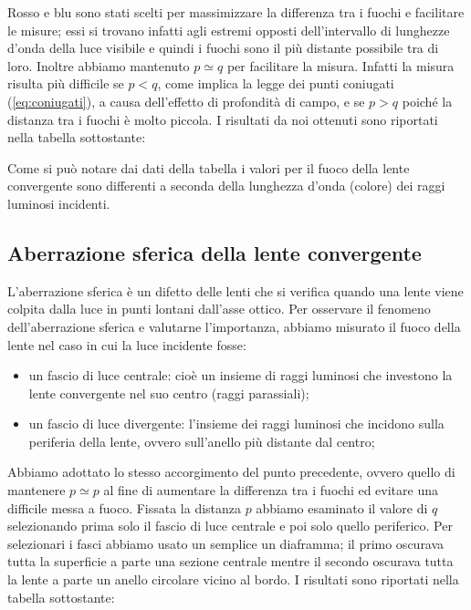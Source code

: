 Rosso e blu sono stati scelti per massimizzare la differenza tra i fuochi e facilitare le misure; essi si trovano infatti agli estremi opposti dell'intervallo di lunghezze d'onda della luce visibile e quindi i fuochi sono il più distante possibile tra di loro. Inoltre abbiamo mantenuto $p \simeq q$ per facilitare la misura. Infatti la misura risulta più difficile se $p < q$, come implica la legge dei punti coniugati (\ref{eq:coniugati}), a causa dell'effetto di profondità di campo, e se $p > q$ poiché la distanza tra i fuochi è molto piccola.
I risultati da noi ottenuti sono riportati nella tabella sottostante:


Come si può notare dai dati della tabella i valori per il fuoco della lente convergente sono differenti a seconda della lunghezza d'onda (colore) dei raggi luminosi incidenti.

\subsection{Aberrazione sferica della lente convergente}

L'aberrazione sferica è un difetto delle lenti che si verifica quando una lente viene colpita dalla luce in punti lontani dall'asse ottico.
Per osservare il fenomeno dell'aberrazione sferica e valutarne l'importanza, abbiamo misurato il fuoco della lente nel caso in cui la luce incidente fosse:
\begin{itemize}
    \item{un fascio di luce centrale: cioè un insieme di raggi luminosi che investono la lente convergente nel suo centro (raggi parassiali);}
	\item{un fascio di luce divergente: l'insieme dei raggi luminosi che incidono sulla periferia della lente, ovvero sull'anello più distante dal centro;}
\end{itemize}

Abbiamo adottato lo stesso accorgimento del punto precedente, ovvero quello di mantenere $p \simeq p$ al fine di aumentare la differenza tra i fuochi ed evitare una difficile messa a fuoco. Fissata la distanza $p$ abbiamo esaminato il valore di $q$ selezionando prima solo il fascio di luce centrale e poi solo quello periferico. Per selezionari i fasci abbiamo usato un semplice un diaframma; il primo oscurava tutta la superficie a parte una sezione centrale mentre il secondo oscurava tutta la lente a parte un anello circolare vicino al bordo.
I risultati sono riportati nella tabella sottostante:

